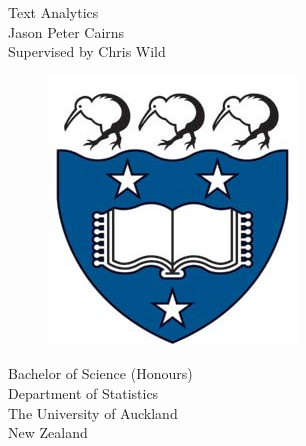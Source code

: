 \message{ !name(jason-cairns-dissertation.tex)}\documentclass[11pt, a4paper, titlepage]{report}
\begin{document}


\begin{titlepage}
  \centering
  \vspace*{2.5cm}
  {\Huge Text Analytics}\\
  \vspace{1.5cm}
  {\Large Jason Peter Cairns}\\
  \vspace{1.5cm}
  Supervised by Chris Wild\\
  \vspace{1.5cm}
  \begin{figure}[h]
    \centering
    \includegraphics[scale=0.4]{img/logo.jpg}
  \end{figure}
  \vspace{1cm}
  Bachelor of Science (Honours)\\
  Department of Statistics\\
  The University of Auckland\\
  New Zealand
\end{titlepage}

\thispagestyle{empty}
\null{}
\newpage

\begin{abstract}
Text Analytics serves to glean insights from a body of text. Within
the broad category of text analytics, we seek to answer questions
about what the text is communicating, what is felt about it, and how
this information is structured. This report describes the creation of
a user-friendly program to perform text analytics functions using
modern R with the Shiny web application framework. A literate style
illustrates top-down the structure of such a program, as well as the
data structures and computational processes that have established
their value for it.
\end{abstract}
\end{document}
